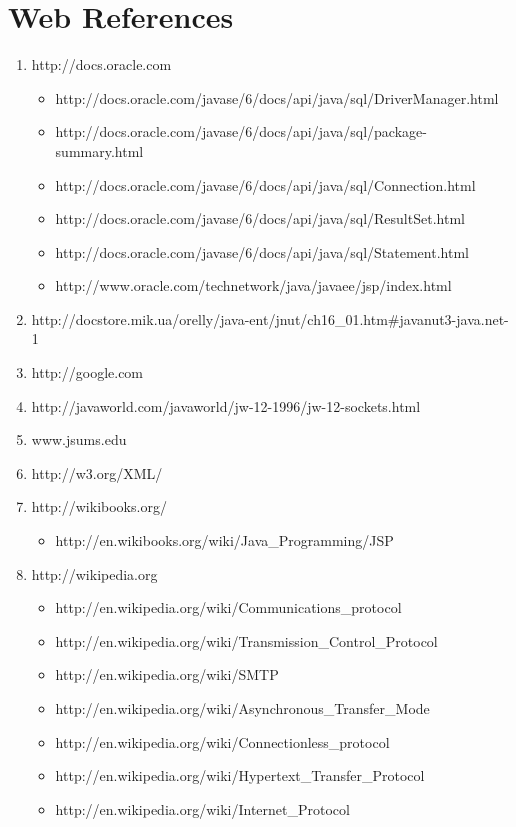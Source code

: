 \chapter{Web References}
\begin{enumerate}
	\item http://docs.oracle.com
	\begin{itemize}
		\item http://docs.oracle.com/javase/6/docs/api/java/sql/DriverManager.html
		\item http://docs.oracle.com/javase/6/docs/api/java/sql/package-summary.html
		\item http://docs.oracle.com/javase/6/docs/api/java/sql/Connection.html
		\item http://docs.oracle.com/javase/6/docs/api/java/sql/ResultSet.html
		\item http://docs.oracle.com/javase/6/docs/api/java/sql/Statement.html
		\item http://www.oracle.com/technetwork/java/javaee/jsp/index.html
	\end{itemize}
	\item http://docstore.mik.ua/orelly/java-ent/jnut/ch16\_01.htm\#javanut3-java.net-1
	\item http://google.com
	\item http://javaworld.com/javaworld/jw-12-1996/jw-12-sockets.html
	\item www.jsums.edu
	\item http://w3.org/XML/
	\item http://wikibooks.org/
	\begin{itemize}
		\item http://en.wikibooks.org/wiki/Java\_Programming/JSP
	\end{itemize}
	\item http://wikipedia.org
	\begin{itemize}
		\item http://en.wikipedia.org/wiki/Communications\_protocol
		\item http://en.wikipedia.org/wiki/Transmission\_Control\_Protocol
		\item http://en.wikipedia.org/wiki/SMTP
		\item http://en.wikipedia.org/wiki/Asynchronous\_Transfer\_Mode
		\item http://en.wikipedia.org/wiki/Connectionless\_protocol
		\item http://en.wikipedia.org/wiki/Hypertext\_Transfer\_Protocol
		\item http://en.wikipedia.org/wiki/Internet\_Protocol

\end{itemize}
\end{enumerate}

